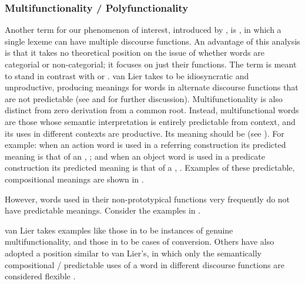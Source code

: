\subsubsection{Multifunctionality / Polyfunctionality}
\label{sec:2.3.1.3}

Another term for our phenomenon of interest, introduced by \parencite{Lier2012}, is , in which a single lexeme can have multiple discourse functions. An advantage of this analysis is that it takes no theoretical position on the issue of whether words are categorial or non-categorial; it focuses on just their functions. The term  is meant to stand in contrast with  or . van Lier takes  to be idiosyncratic and unproductive, producing meanings for words in alternate discourse functions that are not predictable (see  and  for further discussion). Multifunctionality is also distinct from zero derivation from a common root. Instead, multifunctional words are those whose semantic interpretation is entirely predictable from context, and its uses in different contexts are productive. Its meaning should be  (see ). For example: when an action word is used in a referring construction its predicted meaning is that of an , ; and when an object word is used in a predicate construction its predicted meaning is that of a , . Examples of these predictable, compositional meanings are shown in .


\noindent However, words used in their non-prototypical functions very frequently do not have predictable meanings. Consider the examples in .



van Lier takes examples like those in  to be instances of genuine multifunctionality, and those in  to be cases of conversion. Others have also adopted a position similar to van Lier's, in which only the semantically compositional / predictable uses of a word in different discourse functions are considered flexible \parencites[pages for compositionality criterion]{EvansOsada2005} .


